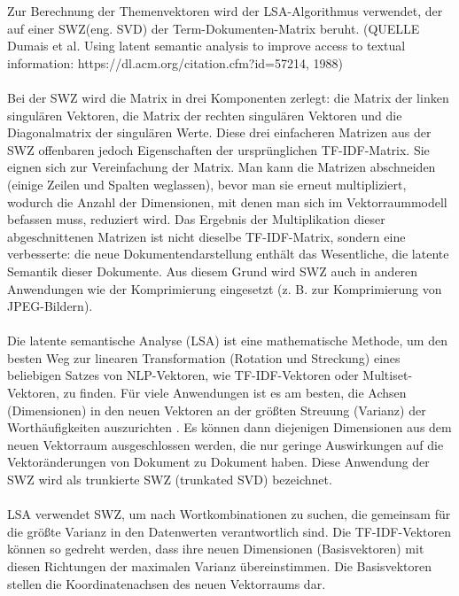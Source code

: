 Zur Berechnung der Themenvektoren wird der \ac{LSA}-Algorithmus verwendet, der auf einer \ac{SWZ}(eng. \ac{SVD}) der Term-Dokumenten-Matrix beruht. (QUELLE Dumais et al. Using latent semantic analysis to improve access to textual information: https://dl.acm.org/citation.cfm?id=57214, 1988)\\\\
Bei der \ac{SWZ} wird die Matrix in drei Komponenten zerlegt: die Matrix der linken singulären Vektoren, die Matrix der rechten singulären Vektoren und die Diagonalmatrix der singulären Werte. 
Diese drei einfacheren Matrizen aus der \ac{SWZ} offenbaren jedoch Eigenschaften der ursprünglichen \ac{TF-IDF}-Matrix. 
Sie eignen sich zur Vereinfachung der Matrix. 
Man kann die Matrizen abschneiden (einige Zeilen und Spalten weglassen), bevor man sie erneut multipliziert, wodurch die Anzahl der Dimensionen, mit denen man sich im Vektorraummodell befassen muss, reduziert wird. 
Das Ergebnis der Multiplikation dieser abgeschnittenen Matrizen ist nicht dieselbe \ac{TF-IDF}-Matrix, sondern eine verbesserte: die neue Dokumentendarstellung enthält das Wesentliche, die latente Semantik dieser Dokumente. 
Aus diesem Grund wird \ac{SWZ} auch in anderen Anwendungen wie der Komprimierung eingesetzt (z. B. zur Komprimierung von JPEG-Bildern). \cite{lane_natural_2019}\\\\
Die latente semantische Analyse (\ac{LSA}) ist eine mathematische Methode, um den besten Weg zur linearen Transformation (Rotation und Streckung) eines beliebigen Satzes von \ac{NLP}-Vektoren, wie \ac{TF-IDF}-Vektoren oder Multiset-Vektoren, zu finden. 
Für viele Anwendungen ist es am besten, die Achsen (Dimensionen) in den neuen Vektoren an der größten Streuung (Varianz) der Worthäufigkeiten auszurichten \cite{jurafsky_speech_2009}.
Es können dann diejenigen Dimensionen aus dem neuen Vektorraum ausgeschlossen werden, die nur geringe Auswirkungen auf die Vektoränderungen von Dokument zu Dokument haben. 
Diese Anwendung der \ac{SWZ} wird als trunkierte \ac{SWZ} (trunkated \ac{SVD}) bezeichnet. \cite{lane_natural_2019}\\\\
\ac{LSA} verwendet \ac{SWZ}, um nach Wortkombinationen zu suchen, die gemeinsam für die größte Varianz in den Datenwerten verantwortlich sind. 
Die \ac{TF-IDF}-Vektoren können so gedreht werden, dass ihre neuen Dimensionen (Basisvektoren) mit diesen Richtungen der maximalen Varianz übereinstimmen. 
Die Basisvektoren stellen die Koordinatenachsen des neuen Vektorraums dar. 
